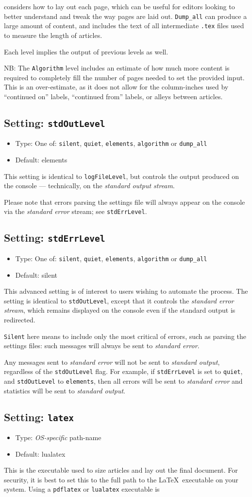 \documentclass[a4paper,DIV=11]{scrartcl}
\newcommand{\property}[5]{
  \subsection{#1: \texttt{#2}}
  \begin{itemize}
  \item Type: #3
  \item Default: #4
  \end{itemize}
  #5
}
\newcommand{\setting}{\property{Setting}}
\begin{document}
\begin{multicols}{2}
{  considers how to lay out each page, which can be useful for editors
  looking to better understand and tweak the
  way pages are laid out. \texttt{Dump\_all} can produce a large amount of content,
  and includes the text of all intermediate \texttt{.tex} files used
  to measure the length of articles.
  \par
  Each level implies the output of previous levels as well.
  \par
  NB: The \texttt{Algorithm} level includes an estimate of how much
  more content is required to completely fill the number of pages
  needed to set the provided input. This is an over-estimate, as
  it does not allow for the column-inches used by ``continued on'' labels,
  ``continued from'' labels, or alleys between articles.
}
\setting{stdOutLevel}{One of: \texttt{silent}, \texttt{quiet}, \texttt{elements},
  \texttt{algorithm} or \texttt{dump\_all}}{elements}{
  This setting is identical to \texttt{logFileLevel}, but controls the
  output produced on the console --- technically, on the
  \textit{standard output stream}.\par Please note that errors parsing
  the settings file will always appear on the console via the
  \textit{standard error} stream; see \texttt{stdErrLevel}.
}
\setting{stdErrLevel}{One of: \texttt{silent}, \texttt{quiet}, \texttt{elements},
  \texttt{algorithm} or \texttt{dump\_all}}{silent}{
  This advanced setting is of interest to users wishing to automate
  the process. The setting is identical to \texttt{stdOutLevel},
  except that it controls the \textit{standard error stream}, which
  remains displayed on the console even if the standard output is
  redirected.\par
  \texttt{Silent} here means to include only the most critical of
  errors, such as parsing the settings files: such messages will
  always be sent to \textit{standard error}. \par
  Any messages sent to \textit{standard error} will not be sent to
  \textit{standard output}, regardless of the \texttt{stdOutLevel}
  flag. For example, if \texttt{stdErrLevel} is set to
  \texttt{quiet}, and \texttt{stdOutLevel} to \texttt{elements}, then
  all errors will be sent to \textit{standard error} and statistics
  will be sent to \textit{standard output}.
}
\setting{latex}{\textit{OS-specific} path-name}{lualatex}{This is the executable used to
  size articles and lay out the final document. For security, it is
  best to set this to the full path to the \LaTeX\ executable on your
  system. Using a \texttt{pdflatex} or \texttt{lualatex} executable is
}
\end{multicols}
\end{document}
